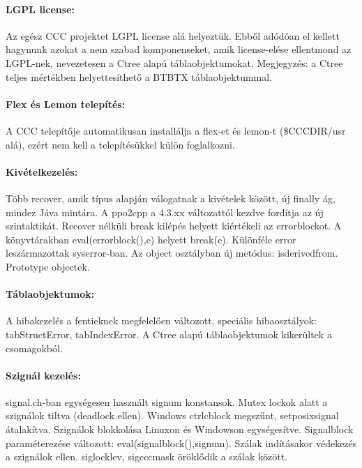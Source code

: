 \begin{description}
  \paragraph{LGPL license:}\label{LGPL}
    Az egész CCC projektet LGPL license alá helyeztük.
    Ebből adódóan el kellett hagynunk azokat a nem szabad 
    komponenseket,  amik license-elése ellentmond az LGPL-nek,
    nevezetesen a Ctree alapú táblaobjektumokat. Megjegyzés:
    a Ctree teljes mértékben helyettesíthető a BTBTX táblaobjektummal.
  
  \paragraph{Flex és Lemon telepítés:}\label{FLEX}
    A CCC telepítője automatikusan installálja a flex-et és lemon-t
    (\$CCCDIR/usr alá), ezért nem kell a telepítésükkel külön  foglalkozni.

  \paragraph{Kivételkezelés:}\label{EXCEPTION}
    Több recover, amik típus alapján
    válogatnak a kivételek között, új finally ág, mindez Jáva mintára.
    A ppo2cpp a 4.3.xx változattól kezdve fordítja az új szintaktikát.
    Recover nélküli break kilépés helyett kiértékeli az errorblockot.
    A könyvtárakban eval(errorblock(),e) helyett break(e).
    Különféle error leszármazottak syserror-ban.
    Az object osztályban új metódus: isderivedfrom.
    Prototype objectek.

    \paragraph{Táblaobjektumok:}
    A hibakezelés a fentieknek megfelelően változott,
    speciális hibaosztályok: tabStructError, tabIndexError.
    A Ctree alapú táblaobjektumok kikerültek a csomagokból.

  \paragraph{Szignál kezelés:}\label{SIGNAL}
    signal.ch-ban egységesen használt signum konstansok.
    Mutex lockok alatt a szignálok tiltva (deadlock ellen).
    Windows ctrlcblock megszűnt, setposixsignal átalakítva.
    Szignálok blokkolása Linuxon és Windowson egységesítve.
    Signalblock paraméterezése változott: eval(signalblock(),signum).
    Szálak indításakor védekezés a szignálok ellen.
    siglocklev, sigcccmask öröklődik a szálak között.


\end{description}
